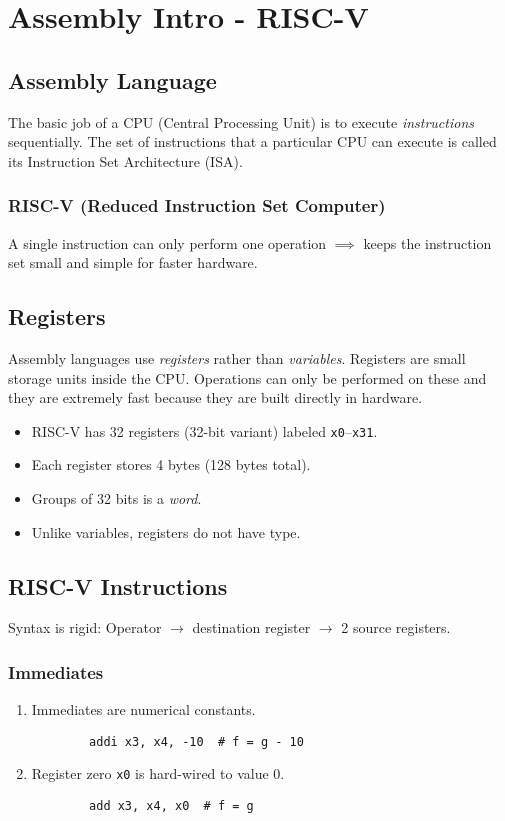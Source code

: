 \chapter{Assembly Intro - RISC-V}

\section{Assembly Language}

The basic job of a CPU (Central Processing Unit) is to execute \emph{instructions} sequentially. The set of instructions that a particular CPU can execute is called its Instruction Set Architecture (ISA).

\subsection{RISC-V (Reduced Instruction Set Computer)}
A single instruction can only perform one operation $\implies$ keeps the instruction set small and simple for faster hardware.

\section{Registers}
Assembly languages use \emph{registers} rather than \emph{variables}. Registers are small storage units inside the CPU. Operations can only be performed on these and they are extremely fast because they are built directly in hardware.
\begin{itemize}
    \item RISC-V has 32 registers (32-bit variant) labeled \texttt{x0}--\texttt{x31}.
    \item Each register stores 4 bytes (128 bytes total).
    \item Groups of 32 bits is a \emph{word}.
    \item Unlike variables, registers do not have type.
\end{itemize}



\section{RISC-V Instructions}
Syntax is rigid: Operator $\rightarrow$ destination register $\rightarrow$ 2 source registers.

\subsection{Immediates}
\begin{enumerate}
	\item Immediates are numerical constants.
	\begin{verbatim}
	    addi x3, x4, -10  # f = g - 10
	\end{verbatim}
	\item Register zero \texttt{x0} is hard-wired to value 0.
	\begin{verbatim}
	    add x3, x4, x0  # f = g
	\end{verbatim}
\end{enumerate}

